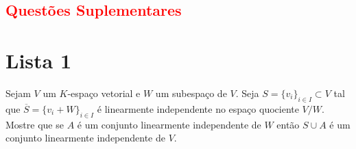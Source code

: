 \documentclass[11pt,a4paper]{article}
\begin{document}
\subsection*{\textcolor{red}{Questões Suplementares}}

\newpage

\section{\textcolor{Floresta}{Lista 1}}


 Sejam $V$ um $K$-espaço vetorial e $W$ um subespaço de $V.$ Seja $S = \{v_i\}_{i\in I} \subset V$ tal que $\overline{S} = \{v_i + W\}_{i\in I}$ é linearmente independente no espaço quociente $V/W.$ Mostre que se $A$ é um conjunto linearmente independente de $W$ então $S \cup A$ é um conjunto linearmente independente de $V.$
\end{document}
